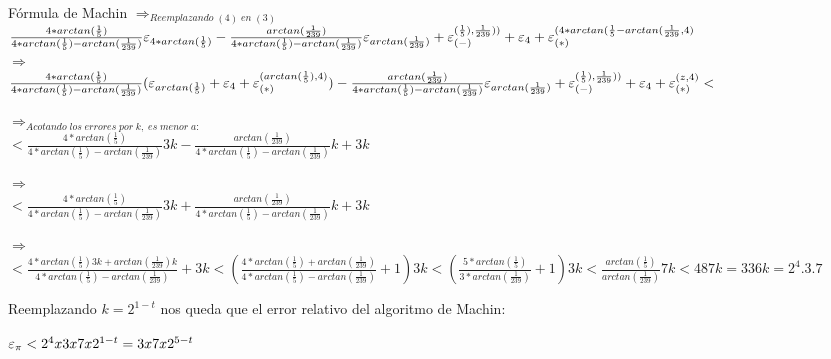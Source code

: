 \begin{section}{Fórmula de Machin}
	$\Rightarrow_{Reemplazando \; (4) \; en \; (3)}$\\
	
	$\frac{4*arctan(\frac{1}{5})}{4*arctan(\frac{1}{5})-arctan(\frac{1}{239})}\varepsilon _{4*arctan(\frac{1}{5})} - \frac{arctan(\frac{1}{239})}{4*arctan(\frac{1}{5})-arctan(\frac{1}{239})}\varepsilon _{arctan(\frac{1}{239})} + \varepsilon _{({-})}^{({\frac{1}{5}),\frac{1}{239})})} + \varepsilon _{4} + \varepsilon _{({*})}^{({4*arctan(\frac{1}{5}-arctan(\frac{1}{239},4})}$\\
	
	$\Rightarrow$\\
	
	$\frac{4*arctan(\frac{1}{5})}{4*arctan(\frac{1}{5})-arctan(\frac{1}{239})}(\varepsilon _{arctan(\frac{1}{5})}+\varepsilon _{4}+\varepsilon _{({*})}^{({arctan(\frac{1}{5}),4})}) - \frac{arctan(\frac{1}{239})}{4*arctan(\frac{1}{5})-arctan(\frac{1}{239})}\varepsilon _{arctan(\frac{1}{239})} + \varepsilon _{({-})}^{({\frac{1}{5}),\frac{1}{239})})} + \varepsilon _{4} + \varepsilon _{({*})}^{({z,4})} < $
	
	$\Rightarrow_{Acotando \; los \; errores \; por \; k, \; es \; menor \; a:}$\\
	
	$< \frac{4*arctan(\frac{1}{5})}{4*arctan(\frac{1}{5})-arctan(\frac{1}{239})}3k - \frac{arctan(\frac{1}{239})}{4*arctan(\frac{1}{5})-arctan(\frac{1}{239})}k+3k $
	
	$\Rightarrow$\\
	
	$< \frac{4*arctan(\frac{1}{5})}{4*arctan(\frac{1}{5})-arctan(\frac{1}{239})}3k + \frac{arctan(\frac{1}{239})}{4*arctan(\frac{1}{5})-arctan(\frac{1}{239})}k+3k $
	
	$\Rightarrow$\\
	
	$< \frac{4*arctan(\frac{1}{5})3k+arctan(\frac{1}{239})k}{4*arctan(\frac{1}{5})-arctan(\frac{1}{239})} + 3k < (\frac{4*arctan(\frac{1}{5})+arctan(\frac{1}{239})}{4*arctan(\frac{1}{5})-arctan(\frac{1}{239})} + 1)3k < (\frac{5*arctan(\frac{1}{5})}{3*arctan(\frac{1}{239})} + 1)3k < \frac{arctan(\frac{1}{5})}{arctan(\frac{1}{239})}7k < 48 7k = 336k = 2^{4}.3.7$
	
	Reemplazando $k=2^{1-t}$ nos queda que el error relativo del algoritmo de Machin:
	
		$\varepsilon _{\pi} < 2^{4} x 3 x 7 x 2^{1-t} = 3 x 7 x 2^{5-t}$
	
	
\end{section}
